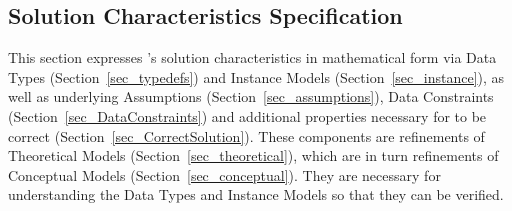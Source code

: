 \subsection{Solution Characteristics Specification}\label{Sec_scs}

This section expresses \progname{}'s solution characteristics in mathematical 
form via Data Types (Section~\ref{sec_typedefs}) and Instance Models 
(Section~\ref{sec_instance}), as well as underlying Assumptions 
(Section~\ref{sec_assumptions}), Data Constraints 
(Section~\ref{sec_DataConstraints}) and additional properties necessary for 
\progname{} to be correct (Section~\ref{sec_CorrectSolution}). These components 
are refinements of Theoretical Models (Section~\ref{sec_theoretical}), which 
are in turn refinements of Conceptual Models (Section~\ref{sec_conceptual}). 
They are necessary for understanding the Data Types and Instance Models so that 
they can be verified.



\afterpage{\clearpage}\newpage %



\newpage



\newpage



\newpage







\newpage



\newpage



